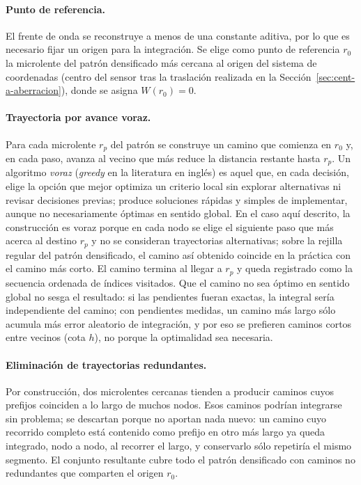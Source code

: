 \documentclass[letterpaper,12pt,oneside]{book}
\begin{document}
\paragraph{Punto de referencia.} El frente de onda se reconstruye a menos de una constante
aditiva, por lo que es necesario fijar un origen para la integración. Se elige como punto
de referencia $r_0$ la microlente del patrón densificado más cercana al origen del sistema
de coordenadas (centro del sensor tras la traslación realizada en la
Sección~\ref{sec:cent-a-aberracion}), donde se asigna $W(r_0) = 0$.

\paragraph{Trayectoria por avance voraz.} Para cada microlente $r_p$ del patrón se
construye un camino que comienza en $r_0$ y, en cada paso, avanza al vecino que más reduce
la distancia restante hasta $r_p$. Un algoritmo \emph{voraz} (\textit{greedy} en la
literatura en inglés) es aquel que, en cada decisión, elige la opción que mejor optimiza
un criterio local sin explorar alternativas ni revisar decisiones previas; produce
soluciones rápidas y simples de implementar, aunque no necesariamente óptimas en sentido
global. En el caso aquí descrito, la construcción es voraz porque en cada nodo se elige el
siguiente paso que más acerca al destino $r_p$ y no se consideran trayectorias
alternativas; sobre la rejilla regular del patrón densificado, el camino así obtenido
coincide en la práctica con el camino más corto. El camino termina al llegar a $r_p$ y
queda registrado como la secuencia ordenada de índices visitados. Que el camino no sea
óptimo en sentido global no sesga el resultado: si las pendientes fueran exactas, la
integral sería independiente del camino; con pendientes medidas, un camino más largo sólo
acumula más error aleatorio de integración, y por eso se prefieren caminos cortos entre
vecinos (cota $h$), no porque la optimalidad sea necesaria.

\paragraph{Eliminación de trayectorias redundantes.} Por construcción, dos microlentes
cercanas tienden a producir caminos cuyos prefijos coinciden a lo largo de muchos nodos.
Esos caminos podrían integrarse sin problema; se descartan porque no aportan nada nuevo:
un camino cuyo recorrido completo está contenido como prefijo en otro más largo ya queda
integrado, nodo a nodo, al recorrer el largo, y conservarlo sólo repetiría el mismo
segmento. El conjunto resultante cubre todo el patrón densificado con caminos no
redundantes que comparten el origen $r_0$.
\end{document}
